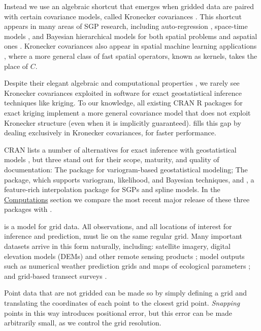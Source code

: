 Instead we use an algebraic shortcut that emerges when gridded data are paired with certain covariance models, called Kronecker covariances \citep{flaxman2015fast, koch2020computationally, drton2021existence}. This shortcut appears in many areas of SGP research, including auto-regression \citep{martin1979subclass}, space-time models \citep{kyriakidis1999geostatistical, genton2007separable}, and Bayesian hierarchical models for both spatial problems \citep{wilson2014fast, flaxman2015fast2} and aspatial ones \citep{stegle2011efficient, ronneberg2021bayesynergy}. Kronecker covariances also appear in spatial machine learning applications \citep{rasmussen2006gaussian, neal2012bayesian, yang2015carte}, where a more general class of fast spatial operators, known as kernels, takes the place of \(C\).

Despite their elegant algebraic and computational properties \citep{van2000ubiquitous}, we rarely see Kronecker covariances exploited in software for exact geostatistical inference techniques like kriging. To our knowledge, all existing CRAN R packages for exact kriging implement a more general covariance model that does not exploit Kronecker structure (even when it is implicitly guaranteed).  fills this gap by dealing exclusively in Kronecker covariances, for faster performance.

CRAN lists a number of alternatives for exact inference with geostatistical models \citep{bivand2022cran}, but three stand out for their scope, maturity, and quality of documentation: The  package for variogram-based geostatistical modeling; The  package, which supports variogram, likelihood, and Bayesian techniques, and , a feature-rich interpolation package for SGPs and spline models. In the \protect\hyperlink{computations}{Computations} section we compare the most recent major release of these three packages with .

 is a model for grid data. All observations, and all locations of interest for inference and prediction, must lie on the same regular grid. Many important datasets arrive in this form naturally, including: satellite imagery, digital elevation models (DEMs) and other remote sensing products \citep{cracknell1998review}; model outputs such as numerical weather prediction grids and maps of ecological parameters \citep{beaudoin2018tracking}; and grid-based transect surveys \citep{foster2020spatially}.

Point data that are not gridded can be made so by simply defining a grid and translating the coordinates of each point to the closest grid point. \emph{Snapping} points in this way introduces positional error, but this error can be made arbitrarily small, as we control the grid resolution.

